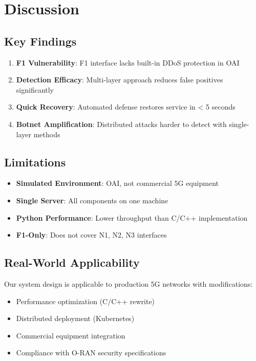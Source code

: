 \documentclass[conference]{IEEEtran}
\begin{document}
\section{Discussion}

\subsection{Key Findings}

\begin{enumerate}
    \item \textbf{F1 Vulnerability}: F1 interface lacks built-in DDoS protection in OAI
    \item \textbf{Detection Efficacy}: Multi-layer approach reduces false positives significantly
    \item \textbf{Quick Recovery}: Automated defense restores service in < 5 seconds
    \item \textbf{Botnet Amplification}: Distributed attacks harder to detect with single-layer methods
\end{enumerate}

\subsection{Limitations}

\begin{itemize}
    \item \textbf{Simulated Environment}: OAI, not commercial 5G equipment
    \item \textbf{Single Server}: All components on one machine
    \item \textbf{Python Performance}: Lower throughput than C/C++ implementation
    \item \textbf{F1-Only}: Does not cover N1, N2, N3 interfaces
\end{itemize}

\subsection{Real-World Applicability}

Our system design is applicable to production 5G networks with modifications:
\begin{itemize}
    \item Performance optimization (C/C++ rewrite)
    \item Distributed deployment (Kubernetes)
    \item Commercial equipment integration
    \item Compliance with O-RAN security specifications \cite{oran-security}
\end{itemize}
\end{document}
